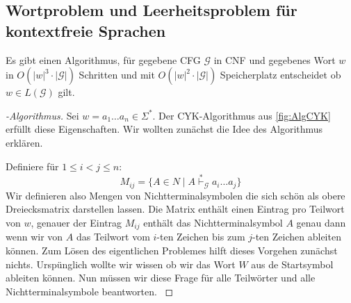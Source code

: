 \newcommand{\expl}[1]{{\color{blue} #1}}

\subsection{Wortproblem und Leerheitsproblem für kontextfreie Sprachen}
\begin{Satz}[name={[Wortproblem für \acs*{CFL} entscheidbar]}]
	Es gibt einen Algorithmus, für gegebene \ac{CFG} $\mathcal{G}$ in \ac{CNF} und gegebenes Wort $w$
	in $O(|w|^3\cdot |\mathcal{G}|)$ Schritten und mit $O(|w|^2\cdot |\mathcal{G}|)$ Speicherplatz
	entscheidet ob $w\in L(\mathcal{G})$ gilt.
\end{Satz}



\begin{proof}[-Algorithmus] Sei $w = a_1\dots a_n\in\Sigma^*$.
	Der \ac{CYK}-Algorithmus aus \autoref{fig:AlgCYK} erfüllt diese Eigenschaften.
	Wir wollten zunächst die Idee des Algorithmus erklären.
	
	Definiere für $1\leq i < j\leq n$:
	\[
	M_{ij} = \{ A \in N \mid A \stackrel{*}{\vdash}_\mathcal{G} a_i\dots a_j \}\label{eqn:CykMatrixEintragDeriv}\tag{EntryDeriv}
	\]
	\expl{Wir definieren also Mengen von Nichtterminalsymbolen die sich schön als obere Dreiecksmatrix darstellen lassen.
		Die Matrix enthält einen Eintrag pro Teilwort von $w$, genauer der Eintrag $M_{ij}$ enthält das Nichtterminalsymbol $A$ 
		genau dann wenn wir von $A$ das Teilwort vom $i$-ten Zeichen bis zum $j$-ten Zeichen ableiten können.
		Zum Lösen des eigentlichen Problemes hilft dieses Vorgehen zunächst nichts.
		Urspünglich wollte wir wissen ob wir das Wort $W$ aus de Startsymbol ableiten können.
		Nun müssen wir diese Frage für alle Teilwörter und alle Nichtterminalsymbole beantworten.
	}
	

\end{proof}
